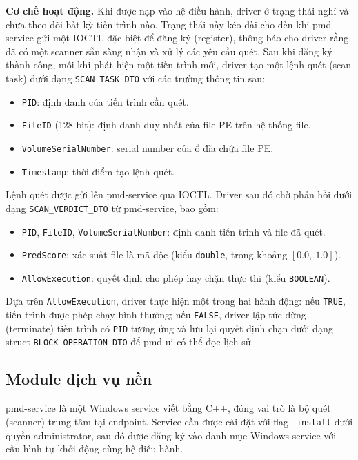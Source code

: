 \textbf{Cơ chế hoạt động.}
Khi được nạp vào hệ điều hành, driver ở trạng thái nghỉ và chưa theo
dõi bất kỳ tiến trình nào. Trạng thái này kéo dài cho đến khi
pmd-service gửi một IOCTL đặc biệt để đăng ký (register), thông báo
cho driver rằng đã có một scanner sẵn sàng nhận và xử lý các yêu cầu
quét. Sau khi đăng ký thành công, mỗi khi phát hiện một tiến trình
mới, driver tạo một lệnh quét (scan task) dưới dạng
\texttt{SCAN\_TASK\_DTO} với các trường thông tin sau:
\begin{itemize}
    \item \texttt{PID}: định danh của tiến trình cần quét.
    \item \texttt{FileID} (128-bit): định danh duy nhất của file PE
        trên hệ thống file.
    \item \texttt{VolumeSerialNumber}: serial number của ổ đĩa chứa
        file PE.
    \item \texttt{Timestamp}: thời điểm tạo lệnh quét.
\end{itemize}

Lệnh quét được gửi lên pmd-service qua IOCTL. Driver sau đó chờ phản
hồi dưới dạng \texttt{SCAN\_VERDICT\_DTO} từ pmd-service, bao gồm:
\begin{itemize}
    \item \texttt{PID}, \texttt{FileID}, \texttt{VolumeSerialNumber}:
        định danh tiến trình và file đã quét.
    \item \texttt{PredScore}: xác suất file là mã độc (kiểu
        \texttt{double}, trong khoảng $[0.0,\ 1.0]$).
    \item \texttt{AllowExecution}: quyết định cho phép hay chặn thực
        thi (kiểu \texttt{BOOLEAN}).
\end{itemize}

Dựa trên \texttt{AllowExecution}, driver thực hiện một trong hai
hành động: nếu \texttt{TRUE}, tiến trình được phép chạy bình thường;
nếu \texttt{FALSE}, driver lập tức dừng (terminate) tiến trình có
\texttt{PID} tương ứng và lưu lại quyết định chặn dưới dạng struct
\texttt{BLOCK\_OPERATION\_DTO} để pmd-ui có thể đọc lịch sử.

\subsection{Module dịch vụ nền}

pmd-service là một Windows service viết bằng C++, đóng vai trò là
bộ quét (scanner) trung tâm tại endpoint. Service cần được cài đặt
với flag \texttt{-install} dưới quyền administrator, sau đó được đăng
ký vào danh mục Windows service với cấu hình tự khởi động cùng hệ
điều hành.

